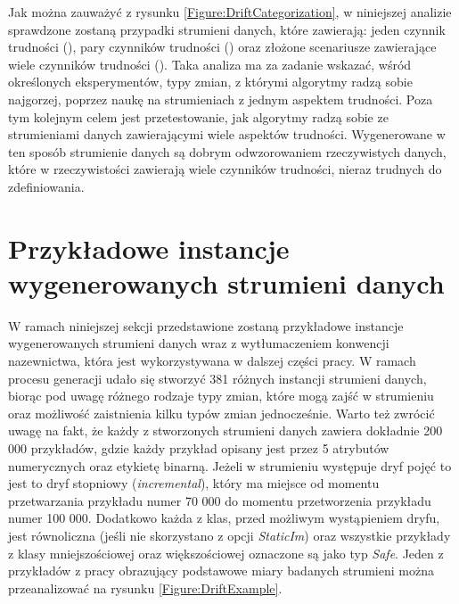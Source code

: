 \noindent Jak można zauważyć z rysunku \ref{Figure:DriftCategorization}, w niniejszej analizie sprawdzone zostaną przypadki strumieni danych, które zawierają: jeden czynnik trudności (), pary czynników trudności () oraz złożone scenariusze zawierające wiele czynników trudności (). Taka analiza ma za zadanie wskazać, wśród określonych eksperymentów, typy zmian, z którymi algorytmy radzą sobie najgorzej, poprzez naukę na strumieniach z jednym aspektem trudności. Poza tym kolejnym celem jest przetestowanie, jak algorytmy radzą sobie ze strumieniami danych zawierającymi wiele aspektów trudności. Wygenerowane w ten sposób strumienie danych są dobrym odwzorowaniem rzeczywistych danych, które w rzeczywistości zawierają wiele czynników trudności, nieraz trudnych do zdefiniowania.

\section{Przykładowe instancje wygenerowanych strumieni danych}

\noindent W ramach niniejszej sekcji przedstawione zostaną przykładowe instancje wygenerowanych strumieni danych wraz z wytłumaczeniem konwencji nazewnictwa, która jest wykorzystywana w dalszej części pracy. W ramach procesu generacji udało się stworzyć 381 różnych instancji strumieni danych, biorąc pod uwagę różnego rodzaje typy zmian, które mogą zajść w strumieniu oraz możliwość zaistnienia kilku typów zmian jednocześnie. Warto też zwrócić uwagę na fakt, że każdy z stworzonych strumieni danych zawiera dokładnie 200 000 przykładów, gdzie każdy przykład opisany jest przez 5 atrybutów numerycznych oraz etykietę binarną. Jeżeli w strumieniu występuje dryf pojęć to jest to dryf stopniowy (\textit{incremental}), który ma miejsce od momentu przetwarzania przykładu numer 70 000 do momentu przetworzenia przykładu numer 100 000. Dodatkowo każda z klas, przed możliwym wystąpieniem dryfu, jest równoliczna (jeśli nie skorzystano z opcji \textit{StaticIm}) oraz wszystkie przykłady z klasy mniejszościowej oraz większościowej oznaczone są jako typ \textit{Safe}. Jeden z przykładów z pracy \cite{Article:TypyPrzykladow} obrazujący podstawowe miary badanych strumieni można przeanalizować na rysunku \ref{Figure:DriftExample}.

